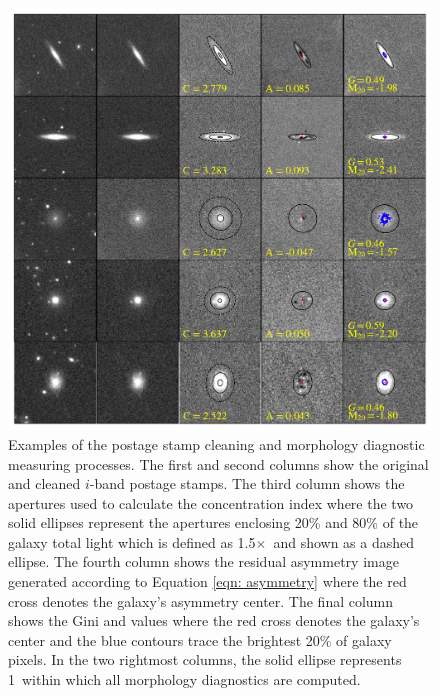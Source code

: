 \begin{figure}
\includegraphics[width=\textwidth]{Figures/measure_morph_bin2_corrected.pdf}
\caption[Examples of image cleaning and morphology diagnostic measurements]{Examples of the postage stamp cleaning and morphology diagnostic measuring processes. The first and second columns show the original and cleaned $i$-band postage stamps. The third column shows the apertures used to calculate the concentration index where the two solid ellipses represent the apertures enclosing 20\% and 80\% of the galaxy total light which is defined as 1.5$\times$\rp~and shown as a dashed ellipse. The fourth column shows the residual asymmetry image generated according to Equation \ref{eqn: asymmetry} where the red cross denotes the galaxy's asymmetry center. The final column shows the Gini and  values where the red cross denotes the galaxy's  center and the blue contours trace the brightest 20\% of galaxy pixels. In the two rightmost columns, the solid ellipse represents 1\rp~within which all morphology diagnostics are computed.}
\label{fig: morph examples} 
\end{figure}


